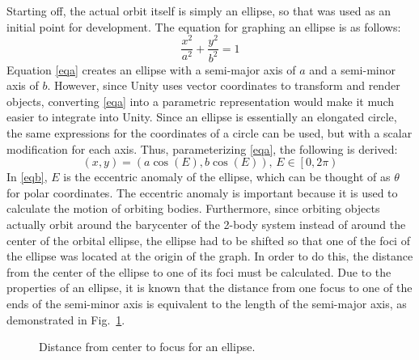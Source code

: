\documentclass[conference]{IEEEtran}
\begin{document}
			Starting off, the actual orbit itself is simply an ellipse, so that was used as an initial point for development. The equation for graphing an ellipse is as follows:
			\begin{equation}
				\frac{x^2}{a^2}+\frac{y^2}{b^2}=1
				\label{eqa}
			\end{equation}
			Equation \eqref{eqa} creates an ellipse with a semi-major axis of \( a \) and a semi-minor axis of \( b \). However, since Unity uses vector coordinates to transform and render objects, converting \eqref{eqa} into a parametric representation would make it much easier to integrate into Unity. Since an ellipse is essentially an elongated circle, the same expressions for the coordinates of a circle can be used, but with a scalar modification for each axis. Thus, parameterizing \eqref{eqa}, the following is derived:
			\begin{equation}
				\left(x,y\right)=\left(a\cos{\left(E\right)},b\cos{\left(E\right)}\right),\,E\in\left[0,2\pi\right)
				\label{eqb}
			\end{equation}
			In \eqref{eqb}, \( E \) is the eccentric anomaly of the ellipse, which can be thought of as \( \theta \) for polar coordinates. The eccentric anomaly is important because it is used to calculate the motion of orbiting bodies. Furthermore, since orbiting objects actually orbit around the barycenter of the 2-body system instead of around the center of the orbital ellipse, the ellipse had to be shifted so that one of the foci of the ellipse was located at the origin of the graph. In order to do this, the distance from the center of the ellipse to one of its foci must be calculated. Due to the properties of an ellipse, it is known that the distance from one focus to one of the ends of the semi-minor axis is equivalent to the length of the semi-major axis, as demonstrated in Fig.~\ref{figH}.
			\begin{figure}[hbtp]
				\begin{center}
				\end{center}
				\caption{Distance from center to focus for an ellipse.}
				\label{figH}
			\end{figure}
\end{document}
